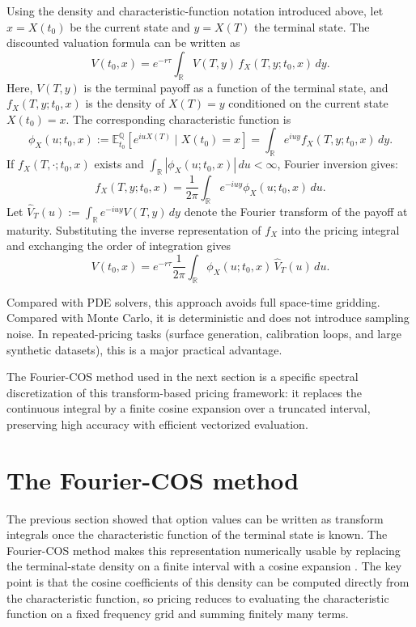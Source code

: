 Using the density and characteristic-function notation introduced above, let $x=X(t_0)$ be the current state and $y=X(T)$ the terminal state. The discounted valuation formula can be written as
\begin{equation}
    V(t_0,x)=e^{-r\tau}\int_{\mathbb R}V(T,y)\,f_X(T,y;t_0,x)\,dy.
\end{equation}
Here, $V(T,y)$ is the terminal payoff as a function of the terminal state, and $f_X(T,y;t_0,x)$ is the density of $X(T)=y$ conditioned on the current state $X(t_0)=x$.
The corresponding characteristic function is
\begin{equation}
    \phi_X(u;t_0,x):=\mathbb E_{t_0}^{\mathbb Q}\!\left[e^{iuX(T)}\mid X(t_0)=x\right]
    =\int_{\mathbb R}e^{iuy}f_X(T,y;t_0,x)\,dy.
\end{equation}
If $f_X(T,\cdot;t_0,x)$ exists and $\int_{\mathbb R}|\phi_X(u;t_0,x)|\,du<\infty$, Fourier inversion gives:
\begin{equation}
    f_X(T,y;t_0,x)=\frac{1}{2\pi}\int_{\mathbb R}e^{-iuy}\phi_X(u;t_0,x)\,du.
\end{equation}
Let $\hat V_T(u):=\int_{\mathbb R}e^{-iuy}V(T,y)\,dy$ denote the Fourier transform of the payoff at maturity. Substituting the inverse representation of $f_X$ into the pricing integral and exchanging the order of integration gives
\begin{equation}
    V(t_0,x)=e^{-r\tau}\frac{1}{2\pi}\int_{\mathbb R}\phi_X(u;t_0,x)\,\hat V_T(u)\,du.
\end{equation}

Compared with PDE solvers, this approach avoids full space-time gridding. Compared with Monte Carlo, it is deterministic and does not introduce sampling noise. In repeated-pricing tasks (surface generation, calibration loops, and large synthetic datasets), this is a major practical advantage.


The Fourier-COS method used in the next section is a specific spectral discretization of this transform-based pricing framework: it replaces the continuous integral by a finite cosine expansion over a truncated interval, preserving high accuracy with efficient vectorized evaluation.

\section{The Fourier-COS method}
\label{sec:fourier_cos_method}
The previous section showed that option values can be written as transform integrals once the characteristic function of the terminal state is known. The Fourier-COS method makes this representation numerically usable by replacing the terminal-state density on a finite interval with a cosine expansion \cite[Secs.~3--4]{fang_oosterlee_2009}. The key point is that the cosine coefficients of this density can be computed directly from the characteristic function, so pricing reduces to evaluating the characteristic function on a fixed frequency grid and summing finitely many terms.

